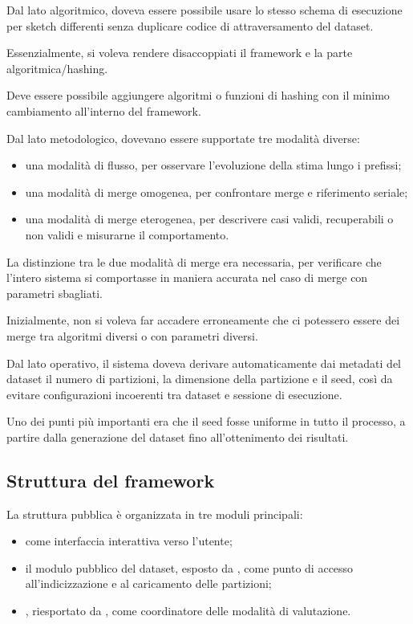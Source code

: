 Dal lato algoritmico, doveva essere possibile usare lo stesso schema di
esecuzione per sketch differenti senza duplicare codice di attraversamento del
dataset.

Essenzialmente, si voleva rendere disaccoppiati il framework e la parte algoritmica/hashing.

Deve essere possibile aggiungere algoritmi o funzioni di hashing con il minimo cambiamento all'interno del framework.

Dal lato metodologico, dovevano essere supportate tre modalità diverse:
\begin{itemize}
    \item una modalità di flusso, per osservare l'evoluzione della stima lungo i
    prefissi;
    \item una modalità di merge omogenea, per confrontare merge e riferimento
    seriale;
    \item una modalità di merge eterogenea, per descrivere casi validi,
    recuperabili o non validi e misurarne il comportamento.
\end{itemize}

La distinzione tra le due modalità di merge era necessaria, per verificare che l'intero sistema
si comportasse in maniera accurata nel caso di merge con parametri sbagliati.

Inizialmente, non si voleva far accadere erroneamente che ci potessero essere dei merge tra algoritmi diversi o con parametri diversi.

Dal lato operativo, il sistema doveva derivare automaticamente dai metadati del
dataset il numero di partizioni, la dimensione della partizione e il seed, così
da evitare configurazioni incoerenti tra dataset e sessione di esecuzione.

Uno dei punti più importanti era che il seed fosse uniforme in tutto il processo, a partire dalla generazione del dataset fino all'ottenimento dei risultati.

\subsection{Struttura del framework}

La struttura pubblica è organizzata in tre moduli principali:
\begin{itemize}
    \item {} come interfaccia interattiva verso
    l'utente;
    \item il modulo pubblico del dataset, esposto da
    , come punto di accesso
    all'indicizzazione e al caricamento delle partizioni;
    \item {}, riesportato da
    , come coordinatore delle modalità
    di valutazione.
\end{itemize}

